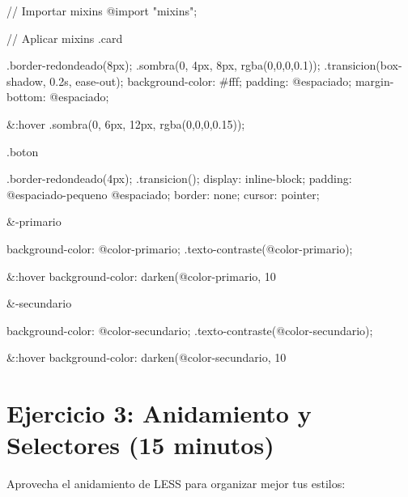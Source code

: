 \documentclass[12pt, a4paper]{article}
\newcommand{\ejercicio}[2]{
    \section*{Ejercicio #1: #2}
    \vspace{0.3em}
}
\begin{document}
\begin{codebox}[title=styles/main.less (continuación)]
// Importar mixins
@import "mixins";

// Aplicar mixins
.card {
  .border-redondeado(8px);
  .sombra(0, 4px, 8px, rgba(0,0,0,0.1));
  .transicion(box-shadow, 0.2s, ease-out);
  background-color: #fff;
  padding: @espaciado;
  margin-bottom: @espaciado;
  
  &:hover {
    .sombra(0, 6px, 12px, rgba(0,0,0,0.15));
  }
}

.boton {
  .border-redondeado(4px);
  .transicion();
  display: inline-block;
  padding: @espaciado-pequeno @espaciado;
  border: none;
  cursor: pointer;
  
  &-primario {
    background-color: @color-primario;
    .texto-contraste(@color-primario);
    
    &:hover {
      background-color: darken(@color-primario, 10%
    }
  }
  
  &-secundario {
    background-color: @color-secundario;
    .texto-contraste(@color-secundario);
    
    &:hover {
      background-color: darken(@color-secundario, 10%
    }
  }
}
\end{codebox}

\ejercicio{3}{Anidamiento y Selectores (15 minutos)}

Aprovecha el anidamiento de LESS para organizar mejor tus estilos:
\end{document}
